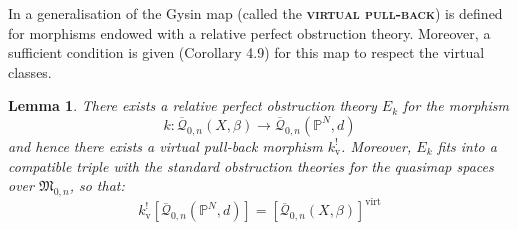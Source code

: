 \documentclass[11pt]{amsart}
\newcommand{\Q}[4]{\overline{\mathcal Q}_{#1,#2}(#3,#4)}
\newcommand{\PP}{\mathbb P}
\renewcommand{\to}{\rightarrow}
\newcommand{\MM}{\mathfrak M}
\newcommand{\virt}[1]{[#1]^{\operatorname{virt}}}
\newcommand{\ildef}[1]{\textbf{\textsc{#1}}}
\theoremstyle{plain}
\newtheorem{lem}[thm]{Lemma}
\theoremstyle{definition}
\begin{document}
In \cite{Manolache-Pull} a generalisation of the Gysin map (called the \ildef{virtual pull-back}) is defined for morphisms endowed with a relative perfect obstruction theory. Moreover, a sufficient condition is given (Corollary 4.9) for this map to respect the virtual classes.

\begin{lem} \label{Exists relative POT} There exists a relative perfect obstruction theory $E_k$ for the morphism
\begin{equation*} k : \Q{0}{n}{X}{\beta} \to \Q{0}{n}{\PP^N}{d} \end{equation*}
and hence there exists a virtual pull-back morphism $k^!_{\text{v}}$. Moreover, $E_k$ fits into a compatible triple with the standard obstruction theories for the quasimap spaces over $\MM_{0,n}$, so that:
\begin{equation*} k^!_{\text{v}} [ \Q{0}{n}{\PP^N}{d} ] = \virt{\Q{0}{n}{X}{\beta}} \end{equation*} \end{lem}
\end{document}
